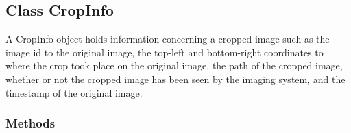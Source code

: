 

\subsection{Class CropInfo}

    \label{client_rest:CropInfo}
A CropInfo object holds information concerning a cropped image such as the 
image id to the original image, the top-left and bottom-right coordinates 
to where the crop took place on the original image, the path of the cropped
image, whether or not the cropped image has been seen by the imaging 
system, and the timestamp of the original image.



  \subsubsection{Methods}

    \label{client_rest:CropInfo:__init__}

    \vspace{0.5ex}

